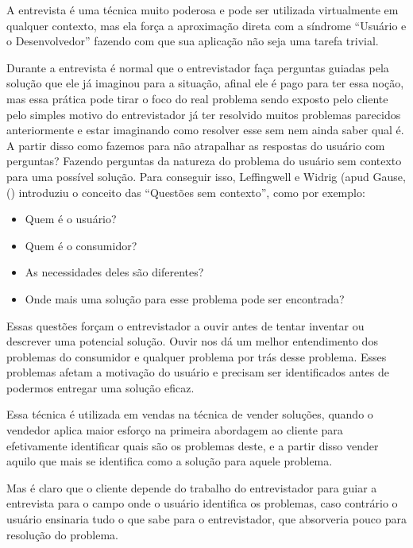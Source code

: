       A entrevista é uma técnica muito poderosa e pode ser utilizada virtualmente em qualquer contexto, 
      mas ela força a aproximação direta com a síndrome “Usuário e o Desenvolvedor” 
      fazendo com que sua aplicação não seja uma tarefa trivial.

      Durante a entrevista é normal que o entrevistador faça perguntas guiadas pela solução que ele já imaginou para a situação, 
      afinal ele é pago para ter essa noção, 
      mas essa prática pode tirar o foco do real problema sendo exposto pelo cliente 
      pelo simples motivo do entrevistador já ter resolvido muitos problemas parecidos 
      anteriormente e estar imaginando como resolver esse sem nem ainda saber qual é. 
      A partir disso como fazemos para não atrapalhar as respostas do usuário com perguntas? 
      Fazendo perguntas da natureza do problema do usuário sem contexto para uma possível solução. 
      Para conseguir isso,  Leffingwell e Widrig (apud Gause, (\citeyear{gause89}) introduziu o conceito das 
      “Questões sem contexto”, como por exemplo:
      
      \begin{itemize}
       \item Quem é o usuário?
       \item Quem é o consumidor?
       \item As necessidades deles são diferentes?
       \item Onde mais uma solução para esse problema pode ser encontrada?
      \end{itemize}
      
      Essas questões forçam o entrevistador a ouvir antes de tentar inventar ou descrever uma potencial solução. 
      Ouvir nos dá um melhor entendimento dos problemas do consumidor e qualquer problema por trás desse problema. 
      Esses problemas afetam a motivação do usuário e precisam ser identificados antes de podermos entregar uma solução eficaz.
    
      Essa técnica é utilizada em vendas na técnica de vender soluções, 
      quando o vendedor aplica maior esforço na primeira abordagem ao cliente para efetivamente identificar quais são os problemas deste, 
      e a partir disso vender aquilo que mais se identifica como a solução para aquele problema.
    
      Mas é claro que o cliente depende do trabalho do entrevistador para guiar a entrevista 
      para o campo onde o usuário identifica os problemas, caso contrário o usuário ensinaria 
      tudo o que sabe para o entrevistador, que absorveria pouco para resolução do problema.
      
